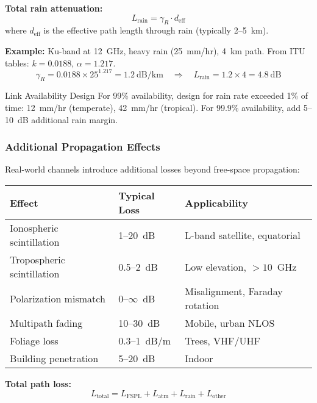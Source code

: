 \textbf{Total rain attenuation:}
\begin{equation}
\label{eq:rain_total}
L_{\text{rain}} = \gamma_R \cdot d_{\text{eff}}
\end{equation}
where $d_{\text{eff}}$ is the effective path length through rain (typically 2--5~km).

\textbf{Example:} Ku-band at 12~GHz, heavy rain (25~mm/hr), 4~km path. From ITU tables: $k = 0.0188$, $\alpha = 1.217$.
\begin{equation}
\gamma_R = 0.0188 \times 25^{1.217} = 1.2~\text{dB/km} \quad \Rightarrow \quad L_{\text{rain}} = 1.2 \times 4 = 4.8~\text{dB}
\end{equation}

\begin{calloutbox}{Link Availability Design}
For 99\% availability, design for rain rate exceeded 1\% of time: 12~mm/hr (temperate), 42~mm/hr (tropical). For 99.9\% availability, add 5--10~dB additional rain margin.
\end{calloutbox}

\subsubsection{Additional Propagation Effects}

Real-world channels introduce additional losses beyond free-space propagation:

\begin{center}
\begin{tabular}{@{}lll@{}}
\toprule
Effect & Typical Loss & Applicability \\
\midrule
Ionospheric scintillation & 1--20~dB & L-band satellite, equatorial \\
Tropospheric scintillation & 0.5--2~dB & Low elevation, $>10$~GHz \\
Polarization mismatch & 0--$\infty$~dB & Misalignment, Faraday rotation \\
Multipath fading & 10--30~dB & Mobile, urban NLOS \\
Foliage loss & 0.3--1~dB/m & Trees, VHF/UHF \\
Building penetration & 5--20~dB & Indoor \\
\bottomrule
\end{tabular}
\end{center}

\textbf{Total path loss:}
\begin{equation}
\label{eq:total_path_loss}
L_{\text{total}} = L_{\text{FSPL}} + L_{\text{atm}} + L_{\text{rain}} + L_{\text{other}}
\end{equation}

